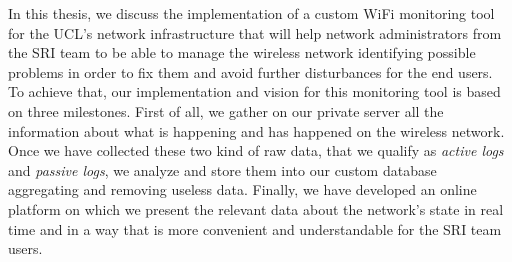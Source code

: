 In this thesis, we discuss the implementation of a custom WiFi monitoring tool for the UCL's network infrastructure that will help network administrators from the SRI team to be able to manage the wireless network identifying possible problems in order to fix them and avoid further disturbances for the end users.\\
To achieve that, our implementation and vision for this monitoring tool is based on three milestones. First of all, we gather on our private server all the information about what is happening and has happened on the wireless network. Once we have collected these two kind of raw data, that we qualify as \textit{active logs} and \textit{passive logs}, we analyze and store them into our custom database aggregating and removing useless data. Finally, we have developed an online platform on which we present the relevant data about the network's state in real time and in a way that is more convenient and understandable for the SRI team users.





